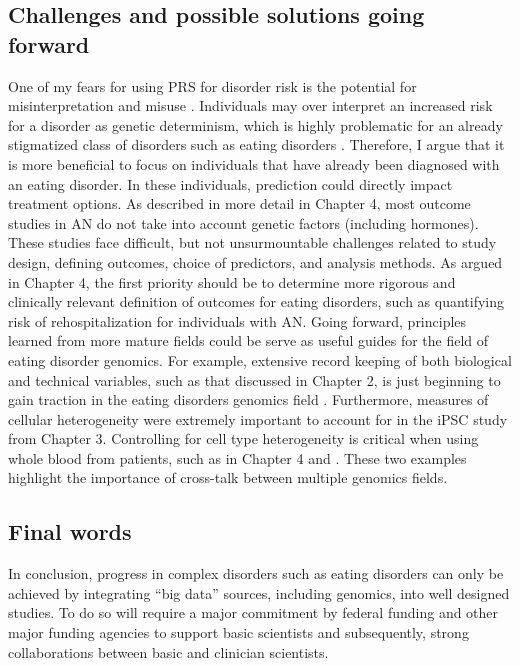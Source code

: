 \subsection{Challenges and possible solutions going forward}
One of my fears for using PRS for disorder risk is the potential for misinterpretation and misuse \cite{RN1127}. Individuals may over interpret an increased risk for a disorder as genetic determinism, which is highly problematic for an already stigmatized class of disorders such as eating disorders \cite{RN1175, RN4209, RN111, RN1137}. Therefore, I argue that it is more beneficial to focus on individuals that have already been diagnosed with an eating disorder. In these individuals, prediction could directly impact treatment options. 
As described in more detail in Chapter 4, most outcome studies in AN do not take into account genetic factors (including hormones). These studies face difficult, but not unsurmountable challenges related to study design, defining outcomes, choice of predictors, and analysis methods. As argued in Chapter 4, the first priority should be to determine more rigorous and clinically relevant definition of outcomes for eating disorders, such as quantifying risk of rehospitalization for individuals with AN. 
Going forward, principles learned from more mature fields could be serve as useful guides for the field of eating disorder genomics. For example, extensive record keeping of both biological and technical variables, such as that discussed in Chapter 2, is just beginning to gain traction in the eating disorders genomics field \cite{RN4569}. Furthermore, measures of cellular heterogeneity were extremely important to account for in the iPSC study from Chapter 3. Controlling for cell type heterogeneity is critical when using whole blood from patients, such as in Chapter 4 and \cite{RN1411}. These two examples highlight the importance of cross-talk between multiple genomics fields. 

\subsection{Final words}
In conclusion, progress in complex disorders such as eating disorders can only be achieved by integrating ``big data'' sources, including genomics, into well designed studies. To do so will require a major commitment by federal funding and other major funding agencies to support basic scientists and subsequently, strong collaborations between basic and clinician scientists.

